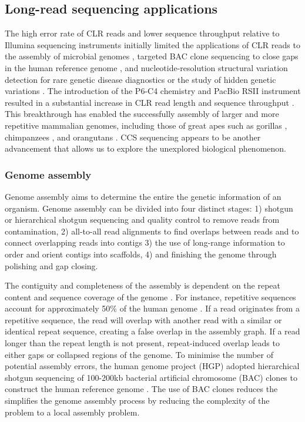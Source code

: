 \subsection{Long-read sequencing applications}

The high error rate of CLR reads and lower sequence throughput relative to Illumina sequencing instruments initially limited the applications of CLR reads to the assembly of microbial genomes \cite{Chin2013-hp}, targeted BAC clone sequencing to close gaps in the human reference genome \cite{Huddleston2014-rs}, and nucleotide-resolution structural variation detection for rare genetic disease diagnostics \cite{Miller2021-lt} or the study of hidden genetic variations \cite{Chaisson2015-zz}. The introduction of the P6-C4 chemistry and PacBio RSII instrument resulted in a substantial increase in CLR read length and sequence throughput \cite{Rhoads2015-pk}. This breakthrough has enabled the successfully assembly of larger and more repetitive mammalian genomes, including those of great apes such as gorillas \cite{Gordon2016-ho}, chimpanzees \cite{Kronenberg2018-wy}, and orangutans \cite{Kronenberg2018-wy}. CCS sequencing appears to be another advancement that allows us to explore the unexplored biological phenomenon. 

\subsubsection{Genome assembly}

Genome assembly aims to determine the entire the genetic information of an organism. Genome assembly can be divided into four distinct stages: 1) shotgun or hierarchical shotgun sequencing and quality control to remove reads from contamination, 2) all-to-all read alignments to find overlaps between reads and to connect overlapping reads into contigs 3) the use of long-range information to order and orient contigs into scaffolds, 4) and finishing the genome through polishing and gap closing.


The contiguity and completeness of the assembly is dependent on the repeat content and sequence coverage of the genome \cite{Lander1988-hu}. For instance, repetitive sequences account for approximately 50\% of the human genome \cite{Lander2001-du}. If a read originates from a repetitive sequence, the read will overlap with another read with a similar or identical repeat sequence, creating a false overlap in the assembly graph. If a read longer than the repeat length is not present, repeat-induced overlap leads to either gaps or collapsed regions of the genome. To minimise the number of potential assembly errors, the human genome project (HGP) adopted hierarchical shotgun sequencing of 100-200kb bacterial artificial chromosome (BAC) clones to construct the human reference genome \cite{Lander2001-du}. The use of BAC clones reduces the simplifies the genome assembly process by reducing the complexity of the problem to a local assembly problem. 

